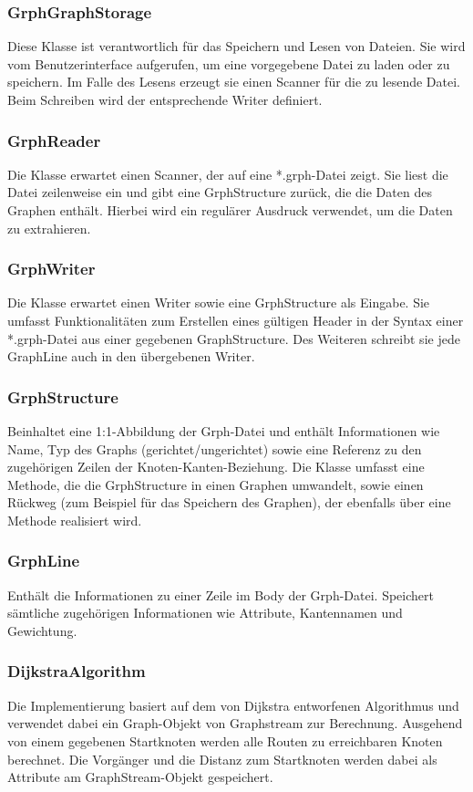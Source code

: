 \subsubsection{GrphGraphStorage}
Diese Klasse ist verantwortlich für das Speichern und Lesen von Dateien. Sie wird vom Benutzerinterface aufgerufen, um eine vorgegebene Datei zu laden oder zu speichern. Im Falle des Lesens erzeugt sie einen Scanner für die zu lesende Datei. Beim Schreiben wird der entsprechende Writer definiert.

\subsubsection{GrphReader}
Die Klasse erwartet einen Scanner, der auf eine *.grph-Datei zeigt. Sie liest die Datei zeilenweise ein und gibt eine GrphStructure zurück, die die Daten des Graphen enthält. Hierbei wird ein regulärer Ausdruck verwendet, um die Daten zu extrahieren.

\subsubsection{GrphWriter}
Die Klasse erwartet einen Writer sowie eine GrphStructure als Eingabe. Sie umfasst Funktionalitäten zum Erstellen eines gültigen Header in der Syntax einer *.grph-Datei aus einer gegebenen GraphStructure. Des Weiteren schreibt sie jede GraphLine auch in den übergebenen Writer.

\subsubsection{GrphStructure}
Beinhaltet eine 1:1-Abbildung der Grph-Datei und enthält Informationen wie Name, Typ des Graphs (gerichtet/ungerichtet) sowie eine Referenz zu den zugehörigen Zeilen der Knoten-Kanten-Beziehung. Die Klasse umfasst eine Methode, die die GrphStructure in einen Graphen umwandelt, sowie einen Rückweg (zum Beispiel für das Speichern des Graphen), der ebenfalls über eine Methode realisiert wird.

\subsubsection{GrphLine}
Enthält die Informationen zu einer Zeile im Body der Grph-Datei. Speichert sämtliche zugehörigen Informationen wie Attribute, Kantennamen und Gewichtung.

\subsubsection{DijkstraAlgorithm}
Die Implementierung basiert auf dem von Dijkstra entworfenen Algorithmus und verwendet dabei ein Graph-Objekt von Graphstream zur Berechnung. Ausgehend von einem gegebenen Startknoten werden alle Routen zu erreichbaren Knoten berechnet. Die Vorgänger und die Distanz zum Startknoten werden dabei als Attribute am GraphStream-Objekt gespeichert.

